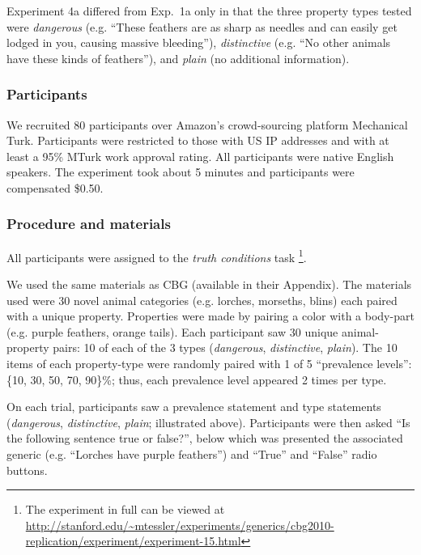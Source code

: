 \documentclass[10pt,letterpaper]{article}
\begin{document}
Experiment 4a differed from Exp.~1a only in that the three property types tested were \emph{dangerous} (e.g. ``These feathers are as sharp as needles and can easily get lodged in you, causing massive bleeding''),  \emph{distinctive} (e.g. ``No other animals have these kinds of feathers''), and \emph{plain} (no additional information). 

\subsubsection{Participants}

We recruited 80 participants over Amazon's crowd-sourcing platform Mechanical Turk. Participants were restricted to those with US IP addresses and with at least a 95\% MTurk work approval rating. All participants were native English speakers. The experiment took about 5 minutes and participants were compensated \$0.50.

\subsubsection{Procedure and materials}

All participants were assigned to the \emph{truth conditions} task \footnote{The experiment in full can be viewed at \url{http://stanford.edu/~mtessler/experiments/generics/cbg2010-replication/experiment/experiment-15.html}}. 
 
We used the same materials as CBG (available in their Appendix). The materials used were 30 novel animal categories (e.g. lorches, morseths, blins) each paired with a unique property. Properties were made by pairing a color with a body-part (e.g. purple feathers, orange tails). Each participant saw 30 unique animal-property pairs: 10 of each of the 3 types (\emph{dangerous}, \emph{distinctive}, \emph{plain}). The 10 items of each property-type were randomly paired with 1 of 5 ``prevalence levels'': \{10, 30, 50, 70, 90\}\%; thus, each prevalence level appeared 2 times per type. 

On each trial, participants saw a prevalence statement and type statements (\emph{dangerous}, \emph{distinctive}, \emph{plain}; illustrated above). 
Participants were then asked ``Is the following sentence true or false?'', below which was presented the associated generic (e.g. ``Lorches have purple feathers'') and ``True'' and ``False'' radio buttons. 
 
\end{document}
